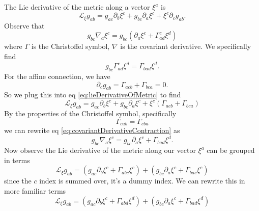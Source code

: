 The Lie derivative of the metric along a vector $\xi^{a}$ is
\begin{equation}\label{eq:lieDerivativeOfMetric}
\mathscr{L}_{\xi}g_{ab} =
g_{ac}\partial_{b}\xi^{c} + 
g_{bc}\partial_{a}\xi^{c} +
\xi^{c}\partial_{c}g_{ab}.
\end{equation}
Observe that
\begin{equation}\label{eq:covariantDerivativeContraction}
g_{bc}\nabla_{a}\xi^{c} = g_{bc}(\partial_a\xi^c + \Gamma^{c}_{ad}\xi^{d})
\end{equation}
where $\Gamma$ is the Christoffel symbol, $\nabla$ is the
covariant derivative. We specifically find
\begin{equation}\label{eq:firstManipulation}
g_{bc}\Gamma^{c}_{ad}\xi^{d} = \Gamma_{bad}\xi^{d}.
\end{equation}
For the affine connection, we have
\begin{equation}\label{eq:affineConnectionConditions}
\partial_{c}g_{ab} = \Gamma_{acb} + \Gamma_{bca} = 0.
\end{equation}
So we plug this into eq \eqref{eq:lieDerivativeOfMetric} to find
\begin{equation}\label{eq:lieDerivativeMutatisMutandi}
\mathscr{L}_{\xi}g_{ab} =
g_{ac}\partial_{b}\xi^{c} + 
g_{bc}\partial_{a}\xi^{c} +
\xi^{c}\left(\Gamma_{acb} + \Gamma_{bca}\right)
\end{equation}
By the properties of the Christoffel symbol, specifically
\begin{equation}%
\Gamma_{cab} = \Gamma_{cba}
\end{equation}
we can rewrite eq \eqref{eq:covariantDerivativeContraction}
as
\begin{equation}%
g_{bc}\nabla_{a}\xi^{c} = g_{bc}\partial_a\xi^c + \Gamma_{bad}\xi^{d}.
\end{equation}
Now observe the Lie derivative of the metric along our vector
$\xi^{a}$ can be grouped in terms
\begin{equation}%
\mathscr{L}_{\xi}g_{ab} =
(g_{ac}\partial_{b}\xi^{c} + \Gamma_{abc}\xi^{c}) + 
(g_{bc}\partial_{a}\xi^{c} + \Gamma_{bac}\xi^{c})
\end{equation}
since the $c$ index is summed over, it's a dummy index. We can
rewrite this in more familiar terms
\begin{equation}%
\mathscr{L}_{\xi}g_{ab} =
(g_{ac}\partial_{b}\xi^{c} + \Gamma_{abd}\xi^{d}) + 
(g_{bc}\partial_{a}\xi^{c} + \Gamma_{bad}\xi^{d})
\end{equation}
